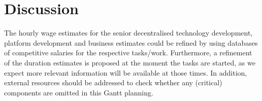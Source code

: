 \section{Discussion}\label{sec:discussion}
The hourly wage estimates for the senior decentralised technology development, platform development and business estimates could be refined by using databases of competitive salaries for the respective tasks/work. Furthermore, a refinement of the duration estimates is proposed at the moment the tasks are started, as we expect more relevant information will be available at those times. In addition, external resources should be addressed to check whether any (critical) components are omitted in this Gantt planning.
